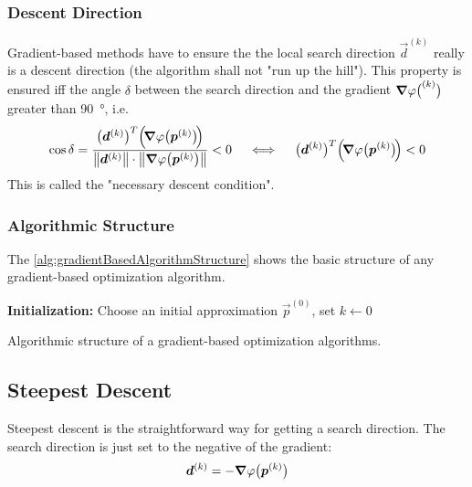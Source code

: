 			\subsubsection{Descent Direction}
				Gradient-based methods have to ensure the the local search direction \(\vec{d}^{(k)}\) really is a descent direction (the algorithm shall not "run up the hill"). This property is ensured iff the angle \( \delta \) between the search direction and the gradient \( \grad{\varphi}\big(\bm{}^{(k)}\big) \) greater than \SI{90}{\degree}, i.e.
				\begin{align}
					\cos \delta = \frac{\big( \bm{d}^{(k)} \big)^T \Big(\!\grad{\varphi}\big(\bm{p}^{(k)}\big) \!\Big)}{\big\lVert \bm{d}^{(k)} \big\rVert \cdot \big\lVert \grad{\varphi}\big(\bm{p}^{(k)}\big) \big\rVert} < 0 \quad\iff\quad \big( \bm{d}^{(k)} \big)^T \Big(\! \grad{\varphi}\big(\bm{p}^{(k)}\big) \!\Big) < 0  \label{eq:descentDirection}
				\end{align}
				This is called the "necessary descent condition".

			\subsubsection{Algorithmic Structure}
				The \autoref{alg:gradientBasedAlgorithmStructure} shows the basic structure of any gradient-based optimization algorithm.

				\begin{algorithm}  \DontPrintSemicolon
					\textbf{Initialization:} Choose an initial approximation \(\vec{p}^{(0)}\), set \( k \gets 0 \) \;

					\caption{Algorithmic structure of a gradient-based optimization algorithms.}
					\label{alg:gradientBasedAlgorithmStructure}
				\end{algorithm}

		\subsection{Steepest Descent}
			Steepest descent is the straightforward way for getting a search direction. The search direction is just set to the negative of the gradient:
			\begin{align*}
				\bm{d}^{(k)} = -\grad{\varphi}\big(\bm{p}^{(k)}\big)
			\end{align*}

